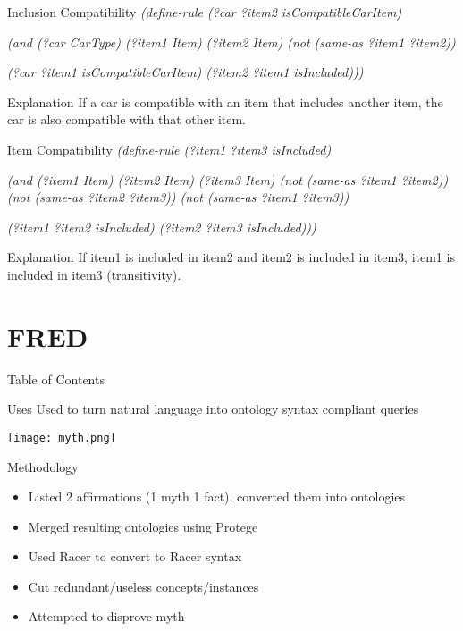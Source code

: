 \documentclass{beamer}
\begin{document}
\begin{frame}{Inclusion Compatibility}
    \textit{(define-rule (?car ?item2 isCompatibleCarItem)}
    
    \textit{(and (?car CarType) (?item1 Item) (?item2 Item) (not (same-as ?item1 ?item2))}
    
    \textit{(?car ?item1 isCompatibleCarItem) (?item2 ?item1 isIncluded))) }
    
    \begin{block}{Explanation}
        If a car is compatible with an item that includes another item, the car is also compatible with that other item.
    \end{block}
     
\end{frame}

\begin{frame}{Item Compatibility}
    \textit{(define-rule (?item1 ?item3 isIncluded)}
    
    \textit{(and (?item1 Item) (?item2 Item) (?item3 Item) (not (same-as ?item1 ?item2)) (not (same-as ?item2 ?item3)) (not (same-as ?item1 ?item3))}
    
    \textit{(?item1 ?item2 isIncluded) (?item2 ?item3 isIncluded))) }
    
    \begin{block}{Explanation}
        If item1 is included in item2 and item2 is included in item3, item1 is included in item3 (transitivity).
    \end{block}
     
\end{frame}

\section{FRED}
\begin{frame}{Table of Contents}
    \tableofcontents[currentsection]
\end{frame}

\begin{frame}{Uses}
    Used to turn natural language into ontology syntax compliant queries
    
    \texttt{[image: myth.png]}
    
\end{frame}

\begin{frame}{Methodology}
    \begin{itemize}
        \item Listed 2 affirmations (1 myth 1 fact), converted them into ontologies
        \item Merged resulting ontologies using Protege
        \item Used Racer to convert to Racer syntax
        \item Cut redundant/useless concepts/instances
        \item Attempted to disprove myth
    \end{itemize}
\end{frame}
\end{document}
